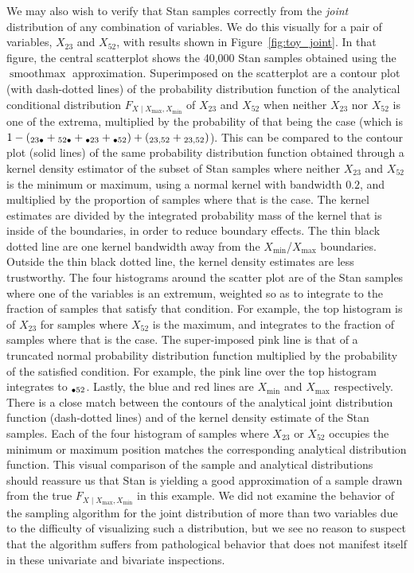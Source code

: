 \documentclass[letter]{article}
\newcommand{\genericdel}[3]{%
      \left#1#3\right#2
    }
\newcommand{\del}[1]{\genericdel(){#1}}
\let\Pr\relax
\DeclareMathOperator{\Pr}{\mathbb{P}}
\DeclareMathOperator*{\softmax}{smoothmax}
\newcommand{\Xmax}{X_{\max}}
\newcommand{\Xmin}{X_{\min}}
\newcommand{\Fcond}{F_{X \mid \Xmax,\Xmin}}
\newcommand{\pxx}[2]{\Pr{}_{#1#2}}
\begin{document}
We may also wish to verify that Stan samples correctly from the \emph{joint} distribution of any combination of variables.
We do this visually for a pair of variables, \(X_{23}\) and \(X_{52}\), with results shown in Figure~\ref{fig:toy_joint}.
In that figure, the central scatterplot shows the 40,000 Stan samples obtained using the \(\softmax\) approximation.
Superimposed on the scatterplot are a contour plot (with dash-dotted lines) of the probability distribution function of the analytical conditional distribution \(\Fcond\) of \(X_{23}\) and \(X_{52}\) when neither \(X_{23}\) nor \(X_{52}\) is one of the extrema, multiplied by the probability of that being the case (which is \(1 - \del{\pxx{23}{\bullet} + \pxx{52}{\bullet} + \pxx{\bullet}{23} + \pxx{\bullet}{52}} + \del{\pxx{23,}{52} + \pxx{23,}{52}}\)).
This can be compared to the contour plot (solid lines) of the same probability distribution function obtained through a kernel density estimator of the subset of Stan samples where neither \(X_{23}\) and \(X_{52}\) is the minimum or maximum,
using a normal kernel with bandwidth \(0.2\),
and multiplied by the proportion of samples where that is the case.
The kernel estimates are divided by the integrated probability mass of the kernel that is inside of the boundaries, in order to reduce boundary effects.
The thin black dotted line are one kernel bandwidth away from the \(\Xmin\)/\(\Xmax\) boundaries.
Outside the thin black dotted line, the kernel density estimates are less trustworthy.
The four histograms around the scatter plot are of the Stan samples where one of the variables is an extremum, weighted so as to integrate to the fraction of samples that satisfy that condition.
For example, the top histogram is of \(X_{23}\) for samples where \(X_{52}\) is the maximum,
and integrates to the fraction of samples where that is the case.
The super-imposed pink line is that of a truncated normal probability distribution function
multiplied by the probability of the satisfied condition.
For example, the pink line over the top histogram integrates to \(\pxx{\bullet}{52}\).
Lastly, the blue and red lines are \(\Xmin\) and \(\Xmax\) respectively.
There is a close match between the contours of the analytical joint distribution function (dash-dotted lines) and of the kernel density estimate of the Stan samples.
Each of the four histogram of samples where \(X_{23}\) or \(X_{52}\) occupies the minimum or maximum position matches the corresponding analytical distribution function.
This visual comparison of the sample and analytical distributions should reassure us that Stan is yielding a good approximation of a sample drawn from the true \(\Fcond\) in this example.
We did not examine the behavior of the sampling algorithm for the joint distribution of more than two variables due to the difficulty of visualizing such a distribution,
but we see no reason to suspect that the algorithm suffers from pathological behavior that does not manifest itself in these univariate and bivariate inspections.
    
\end{document}

